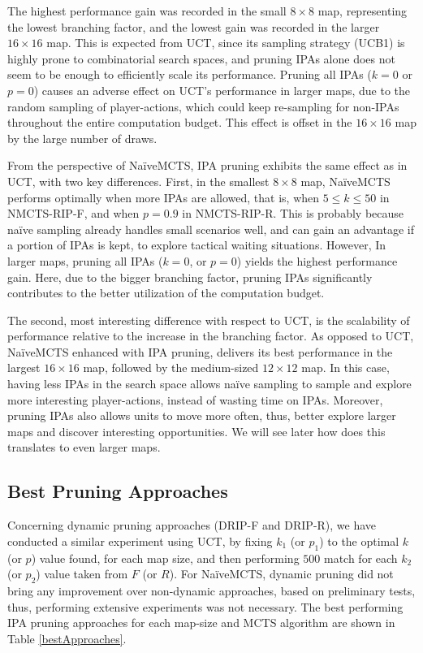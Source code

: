 \documentclass[conference]{IEEEtran}
\begin{document}
The highest performance gain was recorded in the small $8\times8$ map, representing the lowest branching factor, and the lowest gain was recorded in the larger $16\times16$ map. This is expected from UCT, since its sampling strategy (UCB1) is highly prone to combinatorial search spaces, and pruning IPAs alone does not seem to be enough to efficiently scale its performance. Pruning all IPAs ($k = 0$ or $p = 0$) causes an adverse effect on UCT's performance in larger maps, due to the random sampling of player-actions, which could keep re-sampling for non-IPAs throughout the entire computation budget. This effect is offset in the $16\times16$ map by the large number of draws.

From the perspective of NaïveMCTS, IPA pruning exhibits the same effect as in UCT, with two key differences. First, in the smallest $8\times8$ map, NaïveMCTS performs optimally when more IPAs are allowed, that is, when $5 \leq k \leq 50$ in NMCTS-RIP-F, and when $p=0.9$ in NMCTS-RIP-R. This is probably because naïve sampling already handles small scenarios well, and can gain an advantage if a portion of IPAs is kept, to explore tactical waiting situations. However, In larger maps, pruning all IPAs ($k = 0$, or $p = 0$) yields the highest performance gain. Here, due to the bigger branching factor, pruning IPAs significantly contributes to the better utilization of the computation budget.

The second, most interesting difference with respect to UCT, is the scalability of performance relative to the increase in the branching factor. As opposed to UCT, NaïveMCTS enhanced with IPA pruning, delivers its best performance in the largest $16\times16$ map, followed by the medium-sized $12\times12$ map. In this case, having less IPAs in the search space allows naïve sampling to sample and explore more interesting player-actions, instead of wasting time on IPAs. Moreover, pruning IPAs also allows units to move more often, thus, better explore larger maps and discover interesting opportunities. We will see later how does this translates to even larger maps.


\subsection{Best Pruning Approaches}

Concerning dynamic pruning approaches (DRIP-F and DRIP-R), we have conducted a similar experiment using UCT, by fixing $k_1$ (or $p_1$) to the optimal $k$ (or $p$) value found, for each map size, and then performing $500$ match for each $k_2$ (or $p_2$) value taken from $F$ (or $R$). For NaïveMCTS, dynamic pruning did not bring any improvement over non-dynamic approaches, based on preliminary tests, thus, performing extensive experiments was not necessary. The best performing IPA pruning approaches for each map-size and MCTS algorithm are shown in Table \ref{bestApproaches}.
\end{document}
